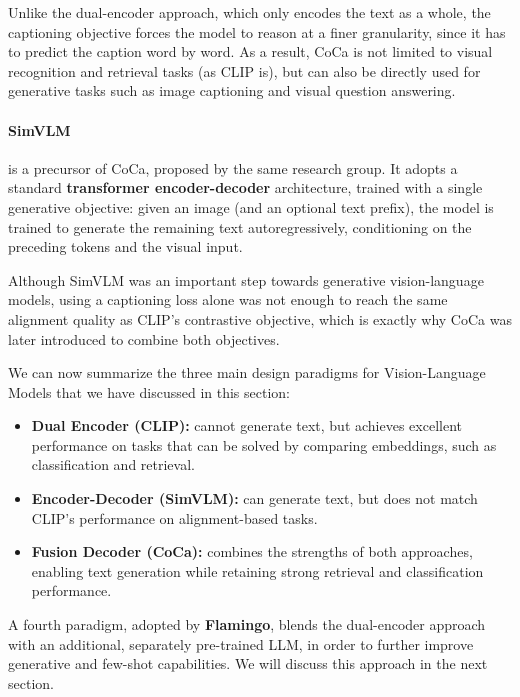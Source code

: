 Unlike the dual-encoder approach, which only encodes the text as a whole, the captioning objective forces the model to reason at a finer granularity, since it has to predict the caption word by word.
As a result, CoCa is not limited to visual recognition and retrieval tasks (as CLIP is), but can also be directly used for generative tasks such as image captioning and visual question answering.

\paragraph{SimVLM} is a precursor of CoCa, proposed by the same research group.
It adopts a standard \textbf{transformer encoder-decoder} architecture, trained with a single generative objective: given an image (and an optional text prefix), the model is trained to generate the remaining text autoregressively, conditioning on the preceding tokens and the visual input.

Although SimVLM was an important step towards generative vision-language models, using a captioning loss alone was not enough to reach the same alignment quality as CLIP's contrastive objective, which is exactly why CoCa was later introduced to combine both objectives.

We can now summarize the three main design paradigms for Vision-Language Models that we have discussed in this section:
\begin{itemize}
    \item \textbf{Dual Encoder (CLIP):} cannot generate text, but achieves excellent performance on tasks that can be solved by comparing embeddings, such as classification and retrieval.
    \item \textbf{Encoder-Decoder (SimVLM):} can generate text, but does not match CLIP's performance on alignment-based tasks.
    \item \textbf{Fusion Decoder (CoCa):} combines the strengths of both approaches, enabling text generation while retaining strong retrieval and classification performance.
\end{itemize}

A fourth paradigm, adopted by \textbf{Flamingo}, blends the dual-encoder approach with an additional, separately pre-trained LLM, in order to further improve generative and few-shot capabilities. We will discuss this approach in the next section.

